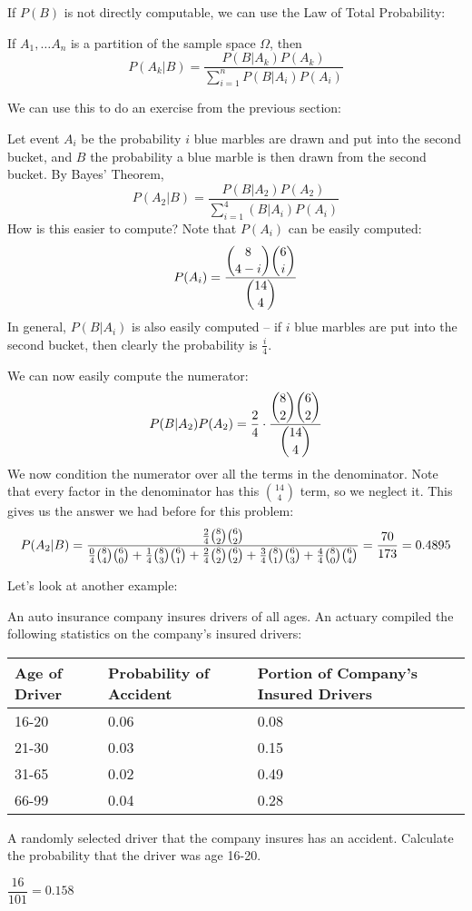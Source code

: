\documentclass[../main.tex]{subfiles}
\begin{document}
If $P(B)$ is not directly computable, we can use the Law of Total Probability: 
\begin{corollary}
If $A_1, \ldots A_n$ is a partition of the sample space $\Omega$, then 
\[
	P(A_k|B) = \frac{P(B|A_k) P(A_k)}{\sum_{i=1}^n P(B|A_i) P(A_i)}
\]
\end{corollary}

We can use this to do an exercise from the previous section: 
\begin{solution} %
Let event $A_i$ be the probability $i$ blue marbles are drawn and put into the second bucket, and $B$ the probability a blue marble is then drawn from the second bucket. By Bayes' Theorem,
\[
	P(A_2|B) = \frac{P(B|A_2) P(A_2)}{\sum_{i=1}^4 (B|A_i) P(A_i)}
\]
How is this easier to compute? Note that $P(A_i)$ can be easily computed: 
\[
	P(A_i) = \frac{\dbinom{8}{4-i} \dbinom{6}{i}}{\dbinom{14}{4}}
\]
In general, $P(B|A_i)$ is also easily computed -- if $i$ blue marbles are put into the second bucket, then clearly the probability is $\frac{i}{4}$. 

We can now easily compute the numerator: 
\[
	P(B|A_2) P(A_2) = \frac{2}{4} \cdot \frac{\dbinom{8}{2} \dbinom{6}{2}}{\dbinom{14}{4}}
\]
We now condition the numerator over all the terms in the denominator. Note that every factor in the denominator has this $\binom{14}{4}$  term, so we neglect it. This gives us the answer we had before for this problem: 
\[
	P(A_2|B) = \frac{\frac{2}{4}\tbinom{8}{2} \tbinom{6}{2}}{\frac{0}{4}\tbinom{8}{4} \tbinom{6}{0} + \frac{1}{4}\tbinom{8}{3} \tbinom{6}{1} + \frac{2}{4}\tbinom{8}{2} \tbinom{6}{2} + \frac{3}{4}\tbinom{8}{1} \tbinom{6}{3} + \frac{4}{4}\tbinom{8}{0} \tbinom{6}{4}} = \frac{70}{173} = 0.4895
\]
\end{solution}
Let's look at another example:
\begin{example}


An auto insurance company insures drivers of all ages. An actuary compiled
the following statistics on the company’s insured drivers:

\begin{center}
	
\begin{tabular}{|p{0.5in}|p{0.8in}|p{1.5in}|}

	\hline
	Age of
Driver
& Probability
of Accident & 	Portion of Company’s
Insured Drivers
\\
	\hline
	16-20 & 0.06 & 0.08 \\
	21-30 & 0.03 & 0.15 \\
	31-65 & 0.02 & 0.49 \\
	66-99 & 0.04 & 0.28 \\
	\hline
\end{tabular}

\end{center}
A randomly selected driver that the company insures has an accident. Calculate the probability that the driver was age 16-20.
\end{example}
\begin{solution}
$\dfrac{16}{101} = 0.158$
\end{solution}
\end{document}

